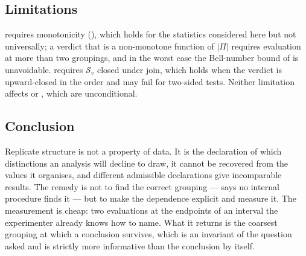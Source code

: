 \documentclass[11pt,a4paper]{article}
\theoremstyle{definition}
\theoremstyle{remark}
\newcommand{\Part}{\Pi}                      %
\begin{document}
\subsection{Limitations}

 requires monotonicity (), which
holds for the statistics considered here but not universally; a verdict
that is a non-monotone function of $|\Part|$ requires evaluation at more
than two groupings, and in the worst case the Bell-number bound of
 is unavoidable.  requires
$\mathcal{S}_v$ closed under join, which holds when the verdict is
upward-closed in the order and may fail for two-sided tests. Neither
limitation affects  or
, which are unconditional.

\subsection{Conclusion}

Replicate structure is not a property of data. It is the declaration of
which distinctions an analysis will decline to draw, it cannot be
recovered from the values it organises, and different admissible
declarations give incomparable results. The remedy is not to find the
correct grouping ---  says no internal procedure
finds it --- but to make the dependence explicit and measure it. The
measurement is cheap: two evaluations at the endpoints of an interval the
experimenter already knows how to name. What it returns is the coarsest
grouping at which a conclusion survives, which is an invariant of the
question asked and is strictly more informative than the conclusion by
itself.



\end{document}
